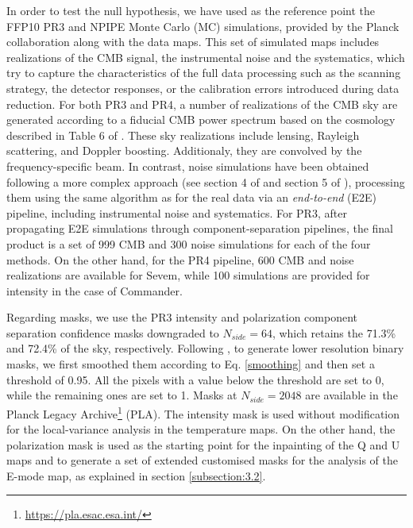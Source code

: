 In order to test the null hypothesis, we have used as the reference point the FFP10 PR3 and NPIPE Monte Carlo (MC) simulations, provided by the Planck collaboration along with the data maps. This set of simulated maps includes realizations of the CMB signal, the instrumental noise and the systematics, 
which try to capture the characteristics of the 
full data processing
such as the scanning strategy, the detector responses, or the calibration errors introduced during data reduction. For both PR3 and PR4, 
a number of realizations of the CMB sky are generated according to a fiducial CMB power spectrum based on the cosmology described in Table 6 of \cite{Planck:2020olo}. These sky realizations include lensing, Rayleigh scattering, and Doppler boosting. Additionaly, they are convolved by the frequency-specific beam. 
In contrast, noise simulations have been obtained following a more complex approach (see section 4 of \cite{Planck:2019evm} and section 5 of \cite{Planck:2020olo}), processing them using the same algorithm as for the real data via an \emph{end-to-end} (E2E) pipeline, including instrumental noise and systematics. For PR3, after propagating E2E simulations through component-separation pipelines, the final product is a set of 999 CMB and 300 noise simulations for each of the four methods. On the other hand, for the PR4 pipeline, 600 CMB and noise realizations are available for Sevem,
while 100 simulations are provided for intensity in the case of Commander.

Regarding masks, we use the PR3 intensity and polarization component separation confidence masks downgraded to $N_{side} = 64$, which retains the 71.3\% and 72.4\% of the sky, respectively.
Following \cite{Planck:2019evm}, to generate lower resolution binary masks, we first smoothed them according to Eq. \ref{smoothing} and then set a threshold of 0.95. All the pixels with a value below the threshold are set to 0, while the remaining ones are set to 1. Masks at $N_{side} = 2048$ are available in the Planck Legacy Archive\footnote{\url{https://pla.esac.esa.int/}} (PLA). The intensity mask is used
without modification for the local-variance analysis in the temperature maps. On the other hand, the polarization mask is used as the starting point for the inpainting of the Q and U maps and to generate a set of extended customised masks for the analysis of the E-mode map, as explained in section \ref{subsection:3.2}. 